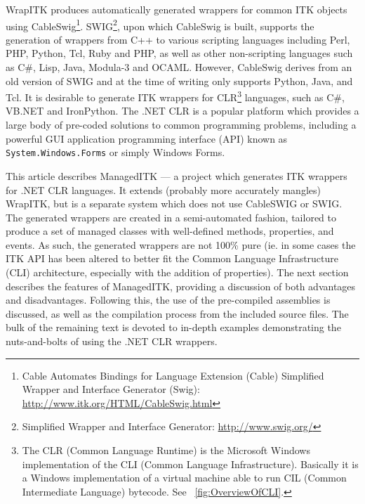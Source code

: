 \documentclass{InsightArticle}
\def\code#1{\texttt{#1}}
\begin{document}
WrapITK produces automatically generated wrappers for common
ITK objects using CableSwig\footnote{Cable Automates Bindings for Language Extension 
(Cable) Simplified Wrapper and Interface Generator (Swig): %
\href{http://www.itk.org/HTML/CableSwig.html}{http://www.itk.org/HTML/CableSwig.html}}.
SWIG\footnote{Simplified Wrapper and Interface Generator: \href{http://www.swig.org/}{http://www.swig.org/}}, 
upon which CableSwig is built, supports the generation of wrappers from C++ to various
scripting languages including Perl, PHP, Python, Tcl, Ruby and PHP, as well as other
non-scripting languages such as C\#, Lisp, Java, Modula-3 and OCAML. 
However, CableSwig derives from an old version of SWIG and
at the time of writing only supports Python, Java, and Tcl.
%
It is desirable to generate ITK wrappers for CLR\footnote{The CLR (Common Language Runtime) is the 
Microsoft Windows implementation of the CLI (Common Language Infrastructure). Basically it is a Windows
implementation of a virtual machine able to run CIL (Common Intermediate Language) bytecode.
See \figurename~\ref{fig:OverviewOfCLI}.} languages, 
such as C\#, VB.NET and IronPython.
The .NET CLR is a popular platform which provides a large body of pre-coded solutions to
common programming problems, including a powerful GUI application 
programming interface (API) known as \code{System.Windows.Forms} or simply Windows Forms.

This article describes ManagedITK --- 
a project which generates ITK wrappers for .NET CLR languages.
It extends (probably more accurately mangles) WrapITK,
but is a separate system which does not use CableSWIG or SWIG.
The generated wrappers are created in a semi-automated fashion, 
tailored to produce a set of managed classes with 
well-defined methods, properties, and events.
As such, the generated wrappers are not 100\% pure 
(ie. in some cases the ITK API has been altered to better fit the 
Common Language Infrastructure (CLI) architecture, 
especially with the addition of properties). 
The next section describes the features of ManagedITK,
providing a discussion of both advantages and disadvantages.
Following this, the use of the pre-compiled assemblies is discussed,
as well as the compilation process from the included source files.
The bulk of the remaining text is devoted to in-depth examples
demonstrating the nuts-and-bolts of using the .NET CLR wrappers.

\end{document}

